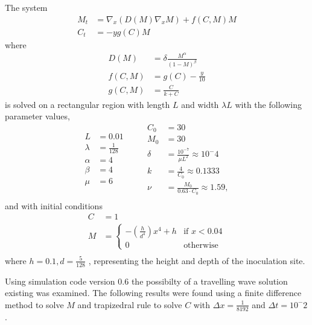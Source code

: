 \documentclass{report}
\begin{document}
The system
\begin{align}
    M_t &= \nabla_x \left( D(M) \nabla_x M \right) + f(C,M) M \\
    C_t &= - y g(C) M 
\end{align}
where
\begin{align}
    D(M) &= \delta \frac{M^\alpha}{(1 - M)^\beta} \\
    f(C,M) &= g(C) - \frac{y}{10} \\
    g(C,M) &= \frac{C}{k +C}
\end{align}
is solved on a rectangular region with length $L$ and width $\lambda L$ with the following parameter values,
\begin{equation}
\begin{aligned}
    L &= 0.01 \\
    \lambda &= \frac{1}{128}\\
    \alpha &= 4 \\
    \beta &= 4 \\
    \mu &= 6 \\      
\end{aligned}
\qquad
\begin{aligned}
    C_0 &= 30 \\
    M_0 &= 30 \\
    \delta &= \frac{10^{-7}}{\mu L^2} \approx 10^-4\\
    k &= \frac{4}{C_0} \approx 0.1333\\
    \nu &= \frac{M_0}{0.63 \cdot C_0} \approx 1.59,\\
\end{aligned}
\end{equation}
and with initial conditions 
\begin{equation}
\begin{aligned}
    C &= 1 \\
    M &= \begin{cases} -(\frac{h}{d^4})x^4 + h & \text{if } x < 0.04 \\ 0 & \text{otherwise }\end{cases} \\
\end{aligned}
\end{equation}  
where $h = 0.1, d=\frac{5}{128}$ , representing the height and depth of the inoculation site.

Using simulation code version $0.6$ the possibilty of a travelling wave solution existing was examined. The following results were found using a finite difference method to solve $M$ and trapizedral rule to solve $C$ with $\Delta x = \frac{1}{8192}$ and $\Delta t = 10^-2$.
\end{document}
